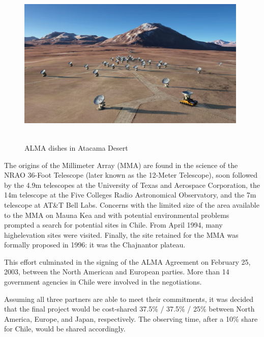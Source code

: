 \begin{figure}[H]
\centering
\includegraphics[width=11cm,height=8cm]{images/alma.jpg}
\caption{ALMA dishes in Atacama Desert}
\end{figure}


The origins of the Millimeter Array (MMA) are found in the science of the NRAO 36-Foot Telescope (later known as the 12-Meter Telescope), soon followed by the 4.9m telescopes at the University of Texas and Aerospace Corporation, the 14m telescope at the Five Colleges Radio Astronomical Observatory, and the 7m telescope at AT\&T Bell Labs. Concerns with the limited size of the area available to the MMA on Mauna Kea and with potential environmental problems prompted a search for potential sites in Chile. From April 1994, many highelevation sites were visited. Finally, the site retained for the MMA was formally proposed in 1996: it was the Chajnantor plateau.  \newline

This effort culminated in the signing of the ALMA Agreement on February 25, 2003, between the North American and European parties. More than 14 government agencies in Chile were involved in the negotiations. \newline

Assuming all three partners are able to meet their commitments, it was decided that the final project would be cost-shared 37.5\% / 37.5\% / 25\% between North America, Europe, and Japan, respectively. The observing time, after a 10\% share for Chile, would be shared accordingly. \newline

